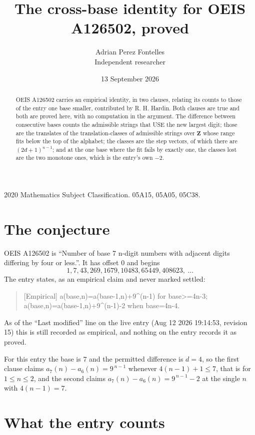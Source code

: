\documentclass[11pt,a4paper]{article}
\title{The cross-base identity for OEIS A126502, proved}
\author{Adrian Perez Fontelles\\ \small Independent researcher}
\date{13 September 2026}
\theoremstyle{plain}
\theoremstyle{definition}
\begin{document}
\maketitle

\begin{abstract}
OEIS A126502 carries an empirical identity, in two clauses, relating its counts to those of the
entry one base smaller, contributed by R. H. Hardin. Both clauses are true and both are proved
here, with no computation in the argument. The difference between consecutive bases counts the
admissible strings that USE the new largest digit; those are the translates of the
translation-classes of admissible strings over $\mathbf{Z}$ whose range fits below the top of
the alphabet; the classes are the step vectors, of which there are $(2d+1)^{n-1}$; and at the
one base where the fit fails by exactly one, the classes lost are the two monotone ones, which
is the entry's own $-2$.
\end{abstract}

\noindent\small 2020 Mathematics Subject Classification. 05A15, 05A05, 05C38.\normalsize

\section{The conjecture}

OEIS A126502 is ``Number of base 7 n-digit numbers with adjacent digits differing by four or less.''. It has offset $0$ and begins
\[
1, 7, 43, 269, 1679, 10483, 65449, 408623,\ \dots
\]
The entry states, as an empirical claim and never marked settled:
\begin{quote}
[Empirical] a(base,n)=a(base-1,n)+9\textasciicircum{}(n-1) for base>=4n-3; a(base,n)=a(base-1,n)+9\textasciicircum{}(n-1)-2 when base=4n-4.
\end{quote}
As of the ``Last modified'' line on the live entry (Aug 12 2026 19:14:53, revision 15)
this is still recorded as empirical, and nothing on the entry records it as proved.

For this entry the base is $7$ and the permitted difference is $d=4$, so the first clause
claims $a_{7}(n)-a_{6}(n)=9^{\,n-1}$ whenever $4(n-1)+1\le7$, that is for
$1\le n\le2$, and the second claims $a_{7}(n)-a_{6}(n)=9^{\,n-1}-2$ at the single
$n$ with $4(n-1)=7$.

\section{What the entry counts}
\end{document}
